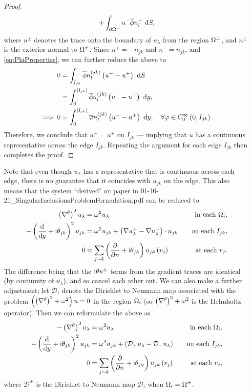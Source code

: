 \documentclass[11pt]{report}
\begin{document}
\begin{proof}
\begin{align*}
		+ \int_{\partial\Omega^-} u^-\overline{\phi}n^-_l  \ \mathrm{d}S,
	\end{align*}
	where $u^{\pm}$ denotes the trace onto the boundary of $u_{\lambda}$ from the region $\Omega^{\pm}$, and $n^{\pm}$ is the exterior normal to $\Omega^{\pm}$.
	Since $n^+ = -n_{jk}$ and $n^- = n_{jk}$, and \eqref{eq:PhiProperties}, we can further reduce the above to
	\begin{align*}
		0 &= \int_{I_{jk}} \overline{\phi}n^{(jk)}_l\left( u^- - u^+ \right)  \ \mathrm{d}S \\
		&= \int_0^{\left\lvert I_{jk} \right\rvert} \overline{\phi}n^{(jk)}_l\left( u^- - u^+ \right) \ \mathrm{d} y, \\
		\implies 0 &= \int_0^{\left\lvert I_{jk} \right\rvert} \overline{\varphi}n^{(jk)}_l\left( u^- - u^+ \right) \ \mathrm{d} y, \quad\forall\varphi\in C^{\infty}_{0}\left( 0, I_{jk} \right).
	\end{align*}
	Therefore, we conclude that $u^- = u^+$ on $I_{jk}$ --- implying that $u$ has a continuous representative across the edge $I_{jk}$.
	Repeating the argument for each edge $I_{jk}$ then completes the proof.
\end{proof}

Note that even though $u_\lambda$ has a representative that is continuous across each edge, there is no guarantee that it coincides with $u_{jk}$ on the edge.
This also means that the system ``derived" on paper in 01-10-21\_SingularInclusionsProblemFormulation.pdf can be reduced to
\begin{align*}
	-\left( \nabla^{\theta} \right)^2 u_{\lambda} &= \omega^2 u_{\lambda} \quad &\text{in each } \Omega_i, \\
	-\left( \dfrac{\mathrm{d}}{\mathrm{d}y} + \mathrm{i}\theta_{jk} \right)^2 u_{jk} &= \omega^2 u_{jk} + \left( \nabla u_{\lambda}^+ - \nabla u_{\lambda}^- \right)\cdot n_{jk} &\quad \text{on each } I_{jk}, \\
	0 &= \sum_{j\sim k}\left( \dfrac{\partial }{\partial n} + \mathrm{i}\theta_{jk} \right)u_{jk}\left( v_j \right) &\quad\text{at each } v_j.
\end{align*}
The difference being that the $\mathrm{i}\theta u^{\pm}$ terms from the gradient traces are identical (by continuity of $u_{\lambda}$), and so cancel each other out.
We can also make a further adjustment; let $\mathcal{D}_i$ denote the Dirichlet to Neumann map associated with the problem $\left(  \left( \nabla^{\theta} \right)^2+\omega^2  \right)u=0$ in the region $\Omega_i$ (so $\left( \nabla^{\theta} \right)^2+\omega^2$ is the Helmholtz operator).
Then we can reformulate the above as
\begin{align*}
	-\left( \nabla^{\theta} \right)^2 u_{\lambda} &= \omega^2 u_{\lambda} \quad &\text{in each } \Omega_i, \\
	-\left( \dfrac{\mathrm{d}}{\mathrm{d}y} + \mathrm{i}\theta_{jk} \right)^2 u_{jk} &= \omega^2 u_{jk} + \left( \mathcal{D}_+ u_{\lambda} - \mathcal{D}_- u_{\lambda} \right) &\quad \text{on each } I_{jk}, \\
	0 &= \sum_{j\sim k}\left( \dfrac{\partial }{\partial n} + \mathrm{i}\theta_{jk} \right)u_{jk}\left( v_j \right) &\quad\text{at each } v_j,
\end{align*}
where $\mathcal{D}^{\pm}$ is the Dirichlet to Neumann map $\mathcal{D}_i$ when $\Omega_i = \Omega^{\pm}$.
\end{document}
